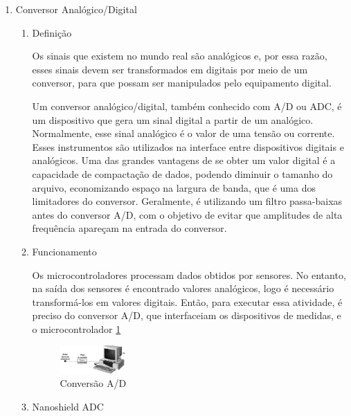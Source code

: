   \begin{enumerate}
    \item Conversor Analógico/Digital
    \begin{enumerate}
      \item Definição

      Os sinais que existem no mundo real são analógicos e, por essa razão, esses sinais devem ser transformados em digitais por meio de um conversor, para que possam ser manipulados pelo equipamento digital.

      Um conversor analógico/digital, também conhecido com A/D ou ADC, é um dispositivo que gera um sinal digital a partir de um analógico. Normalmente, esse sinal analógico é o valor de uma tensão ou corrente. Esses instrumentos são utilizados na interface entre dispositivos digitais e analógicos. Uma das grandes vantagens de se obter um valor digital é a capacidade de compactação de dados, podendo diminuir o tamanho do arquivo, economizando espaço na largura de banda, que é uma dos limitadores do conversor. Geralmente, é utilizando um filtro passa-baixas antes do conversor A/D, com o objetivo de evitar que amplitudes de alta frequência apareçam na entrada do conversor.

      \item Funcionamento

      Os microcontroladores processam dados obtidos por sensores. No entanto, na saída dos sensores é encontrado valores analógicos, logo é necessário transformá-los em valores digitais. Então, para executar essa atividade, é preciso do conversor A/D, que interfaceiam os dispositivos de medidas, e o microcontrolador \ref{fig:conversorAD}

      \begin{figure}[h]
        \centering
        \includegraphics[width=0.25\textwidth]{figuras/conversorAD}
        \caption{Conversão A/D}
        \label{fig:conversorAD}
      \end{figure}

      \item Nanoshield ADC
    \end{enumerate}
  \end{enumerate}
